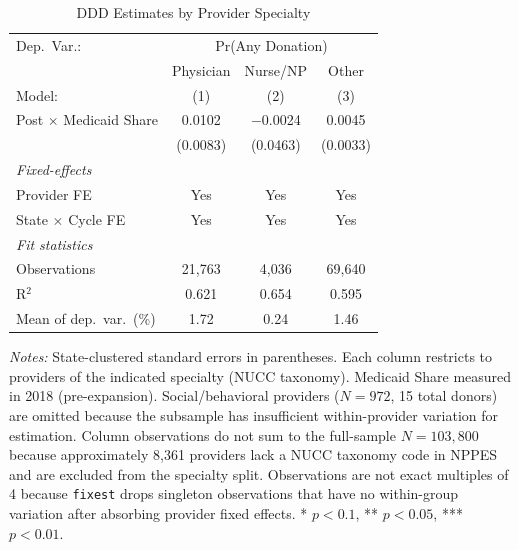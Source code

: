 
\begin{table}[htbp]
   \caption{\label{tab:mechanism} DDD Estimates by Provider Specialty}
   \centering
   \begin{tabular}{lccc}
      \tabularnewline \midrule \midrule
      Dep.\ Var.: & \multicolumn{3}{c}{Pr(Any Donation)}\\
                                                      & Physician & Nurse/NP & Other \\
      Model:                                          & (1)       & (2)      & (3)\\
      \midrule
      Post $\times$ Medicaid Share                   & 0.0102    & $-$0.0024  & 0.0045\\
                                                      & (0.0083)  & (0.0463)   & (0.0033)\\
      \midrule
      \emph{Fixed-effects}\\
      Provider FE                                     & Yes       & Yes        & Yes\\
      State $\times$ Cycle FE                         & Yes       & Yes        & Yes\\
      \midrule
      \emph{Fit statistics}\\
      Observations                                    & 21,763    & 4,036      & 69,640\\
      R$^2$                                           & 0.621     & 0.654      & 0.595\\
      Mean of dep.\ var.\ (\%)                        & 1.72      & 0.24       & 1.46\\
      \midrule \midrule
   \end{tabular}

   \par \raggedright \small
   \textit{Notes:} State-clustered standard errors in parentheses.
   Each column restricts to providers of the indicated specialty (NUCC taxonomy).
   Medicaid Share measured in 2018 (pre-expansion).
   Social/behavioral providers ($N = 972$, 15 total donors) are omitted because the subsample has insufficient within-provider variation for estimation.
   Column observations do not sum to the full-sample $N = 103{,}800$ because approximately 8,361 providers lack a NUCC taxonomy code in NPPES and are excluded from the specialty split. Observations are not exact multiples of 4 because \texttt{fixest} drops singleton observations that have no within-group variation after absorbing provider fixed effects.
   * $p<0.1$, ** $p<0.05$, *** $p<0.01$.
\end{table}

